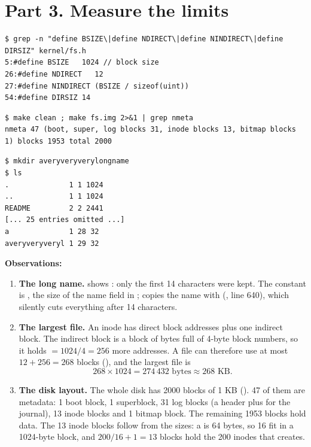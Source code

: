 \documentclass[11pt,a4paper]{article}
\begin{document}
\section{Part 3. Measure the limits}

\begin{lstlisting}[caption={The limits defined in kernel/fs.h}]
$ grep -n "define BSIZE\|define NDIRECT\|define NINDIRECT\|define DIRSIZ" kernel/fs.h
5:#define BSIZE   1024 // block size
26:#define NDIRECT   12
27:#define NINDIRECT (BSIZE / sizeof(uint))
54:#define DIRSIZ 14
\end{lstlisting}

\begin{lstlisting}[caption={The disk layout printed by mkfs}]
$ make clean ; make fs.img 2>&1 | grep nmeta
nmeta 47 (boot, super, log blocks 31, inode blocks 13, bitmap blocks 1) blocks 1953 total 2000
\end{lstlisting}

\begin{lstlisting}[caption={A name longer than DIRSIZ}]
$ mkdir averyveryverylongname
$ ls
.              1 1 1024
..             1 1 1024
README         2 2 2441
[... 25 entries omitted ...]
a              1 28 32
averyveryveryl 1 29 32
\end{lstlisting}

\textbf{Observations:}
\begin{enumerate}
  \item \textbf{The long name.}  shows : only the first 14
  characters were kept. The constant is , the size of the name field in
  ;  copies the name with
   (, line 640), which silently cuts
  everything after 14 characters.
  \item \textbf{The largest file.} An inode has  direct block addresses plus
  one indirect block. The indirect block is a block of  bytes full of 4-byte
  block numbers, so it holds  \(= 1024 / 4 = 256\) more addresses. A file can
  therefore use at most \(12 + 256 = 268\) blocks (), and the largest file is
  \[ 268 \times 1024 = 274\,432 \text{ bytes} \approx 268 \text{ KB}. \]
  \item \textbf{The disk layout.} The whole disk has 2000 blocks of 1 KB
  (). 47 of them are metadata: 1 boot block, 1 superblock, 31 log blocks
  (a header plus  for the journal), 13 inode blocks and 1 bitmap block. The
  remaining 1953 blocks hold data. The 13 inode blocks follow from the sizes: a
   is 64 bytes, so 16 fit in a 1024-byte block, and
  \(200 / 16 + 1 = 13\) blocks hold the 200 inodes that  creates.
\end{enumerate}
\end{document}
